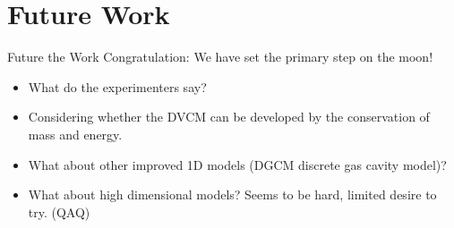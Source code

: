 \documentclass[UTF8]{ctexbeamer}
\begin{document}
\section{Future Work}

\begin{frame}{Future the Work}
    Congratulation: We have set the primary step on the moon!
    \begin{itemize}
        \item What do the experimenters say?
        \item Considering whether the DVCM can be developed by the conservation of mass and energy.
        \item What about other improved 1D models (DGCM discrete gas cavity model)?
        \item What about high dimensional models? Seems to be hard, limited desire to try. (QAQ)
    \end{itemize}
\end{frame}
\end{document}
